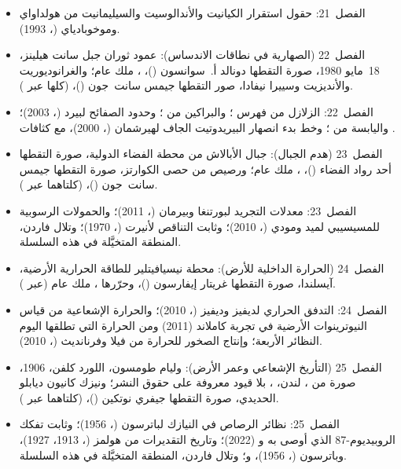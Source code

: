 \begin{itemize}
  \item الفصل~21: حقول استقرار الكيانيت والأندالوسيت والسيليمانيت من هولداواي وموخوبادياي (، 1993).
  \item الفصل~22 (الصهارية في نطاقات الاندساس): عمود ثوران جبل سانت هيلينز، 18~مايو 1980، صورة التقطها دونالد أ.~سوانسون ()، ، ملك عام؛ والغرانوديوريت والأنديزيت وسييرا نيفادا، صور التقطها جيمس سانت~جون ()،  (كلها عبر ).
  \item الفصل~22: الزلازل من فهرس ؛ والبراكين من ؛ وحدود الصفائح لبيرد (، 2003)؛ واليابسة من ؛ وخط بدء انصهار البيريدوتيت الجاف لهيرشمان (، 2000)، مع كثافات .
  \item الفصل~23 (هدم الجبال): جبال الأبالاش من محطة الفضاء الدولية، صورة التقطها أحد رواد الفضاء ()، ، ملك عام؛ ورصيص من حصى الكوارتز، صورة التقطها جيمس سانت~جون ()،  (كلتاهما عبر ).
  \item الفصل~23: معدلات التجريد لبورتنغا وبيرمان (، 2011)؛ والحمولات الرسوبية للمسيسيبي لميد ومودي (، 2010)؛ وثابت التناقص لأنيرت (، 1970)؛ وتلال فاردن، المنطقة المتخيَّلة في هذه السلسلة.
  \item الفصل~24 (الحرارة الداخلية للأرض): محطة نيسيافيتلير للطاقة الحرارية الأرضية، آيسلندا، صورة التقطها غريتار إيفارسون ()، وحرّرها ، ملك عام (عبر ).
  \item الفصل~24: التدفق الحراري لديفيز وديفيز (، 2010)؛ والحرارة الإشعاعية من قياس النيوترينوات الأرضية في تجربة كاملاند (2011) ومن الحرارة التي تطلقها اليوم النظائر الأربعة؛ وإنتاج الصخور للحرارة من فيلا وفرنانديث (، 2010).
  \item الفصل~25 (التأريخ الإشعاعي وعمر الأرض): وليام طومسون، اللورد كلفن، 1906، صورة من ، لندن، ، بلا قيود معروفة على حقوق النشر؛ ونيزك كانيون ديابلو الحديدي، صورة التقطها جيفري نوتكين ()،  (كلتاهما عبر ).
  \item الفصل~25: نظائر الرصاص في النيازك لباترسون (، 1956)؛ وثابت تفكك الروبيديوم-87 الذي أوصى به  و (2022)؛ وتاريخ التقديرات من هولمز (، 1913، 1927)، وباترسون (، 1956)، و؛ وتلال فاردن، المنطقة المتخيَّلة في هذه السلسلة.

\end{itemize}
